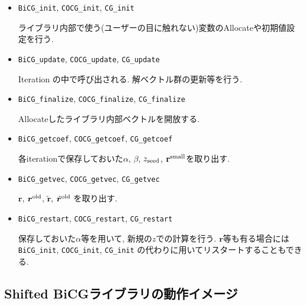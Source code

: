 \documentclass[12pt,titlepage]{jarticle}
\begin{document}
\begin{itemize}
\item \verb|BiCG_init|, \verb|COCG_init|, \verb|CG_init|

ライブラリ内部で使う(ユーザーの目に触れない)変数のAllocateや初期値設定を行う.

\item \verb|BiCG_update|, \verb|COCG_update|, \verb|CG_update|

Iteration の中で呼び出される. 解ベクトル群の更新等を行う.


\item \verb|BiCG_finalize|, \verb|COCG_finalize|, \verb|CG_finalize|

Allocateしたライブラリ内部ベクトルを開放する.

\item \verb|BiCG_getcoef|, \verb|COCG_getcoef|, \verb|CG_getcoef|

各iterationで保存しておいた$\alpha$, $\beta$, $z_{\rm seed}$, ${\bf r}^{\rm small}$を取り出す.

\item \verb|BiCG_getvec|, \verb|COCG_getvec|, \verb|CG_getvec|

${\boldsymbol r}$, ${\boldsymbol r}^{\rm old}$, 
${\tilde {\boldsymbol r}}$, ${\tilde {\boldsymbol r}}^{\rm old}$
を取り出す.

\item \verb|BiCG_restart|, \verb|COCG_restart|, \verb|CG_restart|

保存しておいた$\alpha$等を用いて, 新規の$z$での計算を行う.
${\boldsymbol r}$等も有る場合には
\verb|BiCG_init|, \verb|COCG_init|, \verb|CG_init|
の代わりに用いてリスタートすることもできる.

\end{itemize}

\subsection{Shifted BiCGライブラリの動作イメージ}%
\end{document}
